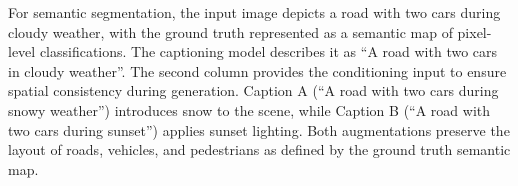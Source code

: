 For semantic segmentation, the input image depicts a road with two cars during cloudy weather, with the ground truth represented as a semantic map of pixel-level classifications. The captioning model describes it as ``A road with two cars in cloudy weather''. The second column provides the conditioning input to ensure spatial consistency during generation. Caption A (``A road with two cars during snowy weather'') introduces snow to the scene, while Caption B (``A road with two cars during sunset'') applies sunset lighting. Both augmentations preserve the layout of roads, vehicles, and pedestrians as defined by the ground truth semantic map.
